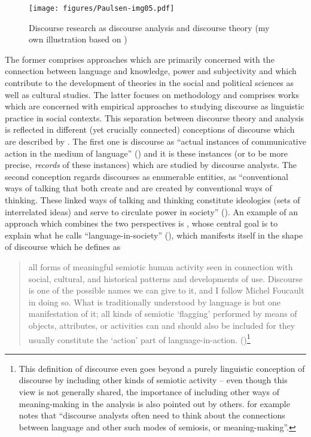 \begin{figure}
\texttt{[image: figures/Paulsen-img05.pdf]}
\caption{
Discourse research as discourse analysis and discourse theory (my own illustration based on \citealt[26]{Angermuller2014})
}
\label{fig:2:5}
\end{figure}

The former comprises approaches which are primarily concerned with the connection between language and knowledge, power and subjectivity and which contribute to the development of theories in the social and political sciences as well as cultural studies. The latter focuses on methodology and comprises works which are concerned with empirical approaches to studying discourse as linguistic practice in social contexts. This separation between discourse theory and analysis is reflected in different (yet crucially connected) conceptions of discourse which are described by \citet{Johnstone2018}. The first one is discourse as “actual instances of communicative action in the medium of language” (\citeyear[2]{Johnstone2018}) and it is these instances (or to be more precise, \emph{records} of these instances) which are studied by discourse analysts. The second conception regards discourses as enumerable entities, as “conventional ways of talking that both create and are created by conventional ways of thinking. These linked ways of talking and thinking constitute ideologies (sets of interrelated ideas) and serve to circulate power in society” (\citeyear[2--3]{Johnstone2018}). An example of an approach which combines the two perspectives is \citet{Blommaert2005}, whose central goal is to explain what he calls “language-in-society” (\citeyear[16]{Blommaert2005}), which manifests itself in the shape of discourse which he defines as

\begin{quote}
all forms of meaningful semiotic human activity seen in connection with social, cultural, and historical patterns and developments of use. Discourse is one of the possible names we can give to it, and I follow Michel Foucault in doing so. What is traditionally understood by language is but one manifestation of it; all kinds of semiotic ‘flagging’ performed by means of objects, attributes, or activities can and should also be included for they usually constitute the ‘action’ part of language-in-action. (\citeyear[3]{Blommaert2005})\footnote{This definition of discourse even goes beyond a purely linguistic conception of discourse by including other kinds of semiotic activity – even though this view is not generally shared, the importance of including other ways of meaning-making in the analysis is also pointed out by others. \citet[2]{Johnstone2018} for example notes that “discourse analysts often need to think about the connections between language and other such modes of semiosis, or meaning-making”.}
\end{quote}


